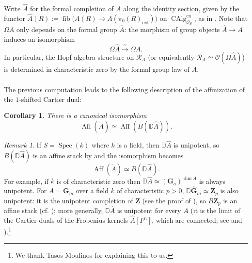 \documentclass[12pt, oneside]{amsart}
\numberwithin{equation}{section}
\newtheorem{corollary}[subsubsection]{Corollary}
\theoremstyle{remark}
\newtheorem{remark}[subsubsection]{Remark}
\theoremstyle{plain}
\newcommand{\R}{\mathcal{R}}
\newcommand{\RA}{\R_A}
\newcommand{\OO}{\mathcal{O}}
\DeclareMathOperator{\spc}{Spec}
\newcommand{\GG}{\mathbf{G}}
\newcommand{\GGa}{\mathbf{G}_{a}}
\newcommand{\GGm}{\mathbf{G}_{m}}
\begin{document}
\subsubsection{}\label{sssec:Omega A hat}

Write $\widehat{A}$ for the formal completion of $A$ along the identity section, given by the functor
$\widehat{A}(R) := \operatorname{fib}\big( A(R) \to A(\pi_0 (R)_{\mathrm{red}}) \big)$ on $\operatorname{CAlg}^{\mathrm{cn}}_{\OO_S}$, as in \cite[Constr.~7.1.1]{LurieEll2}.
Note that $\Omega A$ only depends on the formal group $\widehat{A}$: the morphism of group objects $\widehat{A} \rightarrow A$ induces an isomorphism
\[
  \Omega \widehat{A}
  \xrightarrow{\ \sim\ } \Omega A.
\]
In particular, the Hopf algebra structure on $\RA$ (or equivalently $\RA \simeq \OO(\Omega\widehat{A})$) is determined in characteristic zero by the formal group law of $A$.

\subsubsection{}

The previous computation leads to the following description of the affinization of the $1$-shifted Cartier dual:

\begin{corollary}\label{cor:Aff check}
  There is a canonical isomorphism
  \[ \operatorname{Aff}(\check{A}) \simeq \operatorname{Aff}(B(\mathbb{D}\widehat{A})). \]
\end{corollary}

\begin{remark}\label{rem:D hat A unipotence}
  If $S=\spc(k)$ where $k$ is a field, then $\mathbb{D}\widehat{A}$ is unipotent, so $B(\mathbb{D}\widehat{A})$ is an affine stack by \cite[Thm.~2.4.1]{Toen} and the isomorphism becomes
  \[ \operatorname{Aff}(\check{A}) \simeq B(\mathbb{D}\widehat{A}). \]
  For example, if $k$ is of characteristic zero then $\mathbb{D}\widehat{A} \simeq (\GGa)^{\dim A}$ is always unipotent.
  For $A=\GGm$ over a field $k$ of characteristic $p>0$, $\mathbb{D}\widehat{\GG}_m \simeq \mathbf{Z}_p$ is also unipotent: it is the unipotent completion of $\mathbf{Z}$ (see the proof of \cite[Thm.~2.5.1]{Toen}), so $B\mathbf{Z}_p$ is an affine stack (cf. \cite[Prop.~3.3.4]{MRT}); more generally, $\mathbb{D}\widehat{A}$ is unipotent for every $A$ (it is the limit of the Cartier duals of the Frobenius kernels $\widehat{A}[F^n]$, which are connected; see \cite[\S8.5]{Waterhouse} and \cite[IV, \S2, Prop.~2.3(b)]{DemazureGabriel}).\footnote{%
    We thank Tasos Moulinos for explaining this to us.
  }
\end{remark}
\end{document}
